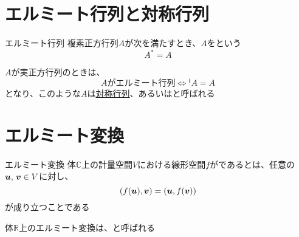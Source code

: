 \documentclass[../../../topic_linear-algebra]{subfiles}
\begin{document}
\sectionline
\section{エルミート行列と対称行列}

\begin{definition}{エルミート行列}
  複素正方行列$A$が次を満たすとき、$A$をという
  \begin{equation*}
    A^* = A
  \end{equation*}
\end{definition}

$A$が実正方行列のときは、
\begin{equation*}
  A\text{がエルミート行列} \Longleftrightarrow {}^tA = A
\end{equation*}
となり、このような$A$は\hyperref[def:symmetric-matrix]{対称行列}、あるいはと呼ばれる

\sectionline
\section{エルミート変換}

\begin{definition}{エルミート変換}
  体$\mathbb{C}$上の計量空間$V$における線形空間$f$がであるとは、任意の$\vb*{u},\,\vb*{v} \in V$に対し、
  \begin{equation*}
    (f(\vb*{u}), \vb*{v}) = (\vb*{u}, f(\vb*{v}))
  \end{equation*}
  が成り立つことである
\end{definition}

体$\mathbb{R}$上のエルミート変換は、と呼ばれる
\end{document}
